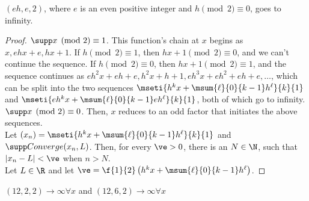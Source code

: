 \documentclass[12pt]{article}
\begin{document}
    \begin{lemma} \label{lemma:eh,e,2}
        $(eh, e, 2)$, where $e$ is an even positive integer and $h \pmod 2 \equiv 0$, goes to infinity. 
    \end{lemma}
    \begin{proof}
        $\supp x \pmod 2 \equiv 1$. This function's chain at $x$  begins as $x, ehx + e, hx + 1$. If $h \pmod 2 \equiv 1$, then $hx + 1 \pmod 2 \equiv 0$, and we can't continue the sequence. If $h \pmod 2 \equiv 0$, then $hx + 1 \pmod 2 \equiv 1$, and the sequence continues as $eh^2x + eh + e, h^2x + h + 1, eh^3x + eh^2 + eh + e,\dots$, which can be split into the two sequences $\mseti{h^kx + \msum{\ell}{0}{k - 1}h^\ell}{k}{1}$ and 
        $\mseti{eh^kx + \msum{\ell}{0}{k - 1} eh^\ell}{k}{1}$, both of which go to infinity. \p
        $\supp x \pmod 2 \equiv 0$. Then, $x$ reduces to an odd factor that initiates the above sequences. \\

        Let $(x_n) = \mseti{h^kx + \msum{\ell}{0}{k - 1}h^\ell}{k}{1}$ and $\supp Converge(x_n, L)$. Then, for every $\ve > 0$, there is an $N \in \N$, such that $|x_n - L| < \ve$ when $n > N$. \\

        Let $L \in \R$ and let $\ve = \f{1}{2}\left(h^kx + \msum{\ell}{0}{k - 1}h^\ell\right)$. 
    \end{proof}
    \begin{example}
        $(12, 2, 2) \to \infty \forall x$ and $(12, 6, 2) \to \infty \forall x$
    \end{example}
\end{document}
